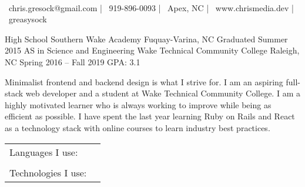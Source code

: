 \documentclass[]{awesome-cv}
\begin{document}
    
\begin{center}
	  \\
	\vspace{2mm}
	{\faEnvelope\ chris.gresock@gmail.com} | {\faMobile\ 919-896-0093} | {\faMapMarker\ Apex, NC} | {\faLink\ www.chrismedia.dev} | {\faGithub\ greasysock}
\end{center}
\begin{cventries}
	\cventry
	{High School}
	{Southern Wake Academy}
	{Fuquay-Varina, NC}
	{Graduated Summer 2015}
	{}
	\cventry
	{AS in Science and Engineering}
	{Wake Technical Community College}
	{Raleigh, NC}
	{Spring 2016 – Fall 2019}
	{GPA: 3.1}
\end{cventries}

\vspace{-2mm}

	Minimalist frontend and backend design is what I strive for. I am an aspiring full-stack web developer and a student at Wake Technical Community College. I am a highly motivated learner who is always working to improve while being as efficient as possible. I have spent the last year learning Ruby on Rails and React as a technology stack with online courses to learn industry best practices.

\begin{cventries}
	\cventry
	{}
	{\def\arraystretch{1.15}{\begin{tabular}{ l l }
		Languages I use:  & {\skill{ JavaScript, Ruby, Python, Go }} \\
		\\
		Technologies I use:  & {\skill{ Ruby on Rails (Ruby), React (JavaScript),  Redux (JavaScript), Sqlalchemy (Python), Git, Linux}} \\
		\end{tabular}}}
	{}
	{}
	{}
\end{cventries}
\end{document}
